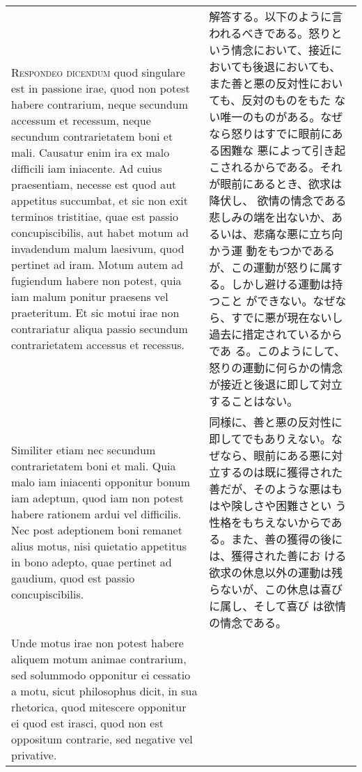 \documentclass[10pt]{jsarticle} %
\begin{document}
\begin{longtable}{p{21em}p{21em}}
\\



{\scshape Respondeo dicendum} quod singulare est in passione irae, quod non potest
 habere contrarium, neque secundum accessum et recessum, neque secundum
 contrarietatem boni et mali. Causatur enim ira ex malo difficili iam
 iniacente. Ad cuius praesentiam, necesse est quod aut appetitus
 succumbat, et sic non exit terminos tristitiae, quae est passio
 concupiscibilis, aut habet motum ad invadendum malum laesivum, quod
 pertinet ad iram. Motum autem ad fugiendum habere non potest, quia iam
 malum ponitur praesens vel praeteritum. Et sic motui irae non
 contrariatur aliqua passio secundum contrarietatem accessus et
 recessus. 

&

解答する。以下のように言われるべきである。怒りという情念において、接近に
 おいても後退においても、また善と悪の反対性においても、反対のものをもた
 ない唯一のものがある。なぜなら怒りはすでに眼前にある困難な
 悪によって引き起こされるからである。それが眼前にあるとき、欲求は降伏し、
 欲情の情念である悲しみの端を出ないか、あるいは、悲痛な悪に立ち向かう運
 動をもつかであるが、この運動が怒りに属する。しかし避ける運動は持つこと
 ができない。なぜなら、すでに悪が現在ないし過去に措定されているからであ
 る。このようにして、怒りの運動に何らかの情念が接近と後退に即して対立
 することはない。


\\

Similiter etiam nec secundum contrarietatem boni et
 mali. Quia malo iam iniacenti opponitur bonum iam adeptum, quod iam non
 potest habere rationem ardui vel difficilis. Nec post adeptionem boni
 remanet alius motus, nisi quietatio appetitus in bono adepto, quae
 pertinet ad gaudium, quod est passio concupiscibilis. 


&

同様に、善と悪の反対性に即してでもありえない。なぜなら、眼前にある悪に対
 立するのは既に獲得された善だが、そのような悪はもはや険しさや困難さとい
 う性格をもちえないからである。また、善の獲得の後には、獲得された善にお
 ける欲求の休息以外の運動は残らないが、この休息は喜びに属し、そして喜び
 は欲情の情念である。

\\

Unde motus irae
 non potest habere aliquem motum animae contrarium, sed solummodo
 opponitur ei cessatio a motu, sicut philosophus dicit, in sua
 rhetorica, quod mitescere opponitur ei quod est irasci, quod non est
 oppositum contrarie, sed negative vel privative.


\end{longtable}
\end{document}
